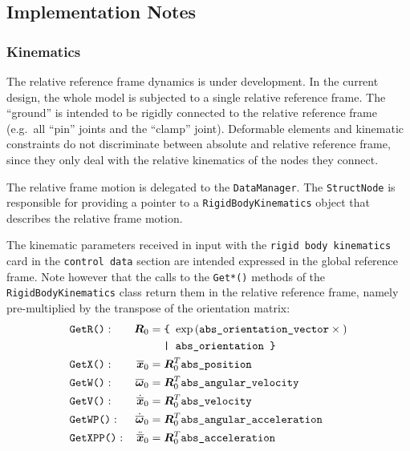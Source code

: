 \documentclass[10pt,fleqn,subeqn]{report}
\newcommand{\T}[1]{\bm{#1}}
\newcommand{\TT}[1]{\bm{#1}}
\begin{document}
\subsection{Implementation Notes}
\label{sec:nodes:structural nodes:implementation notes}

\subsubsection{Kinematics}
The relative reference frame dynamics is under development.
In the current design, the whole model is subjected 
to a single relative reference frame.
The ``ground'' is intended to be rigidly connected
to the relative reference frame (e.g.\ all ``pin'' joints
and the ``clamp'' joint).
Deformable elements and kinematic constraints do not discriminate
between absolute and relative reference frame, since they only deal
with the relative kinematics of the nodes they connect.

The relative frame motion is delegated to the \texttt{DataManager}.
The \texttt{StructNode} is responsible for providing a pointer
to a \texttt{RigidBodyKinematics} object that describes
the relative frame motion.

The kinematic parameters received in input with the
\texttt{rigid body kinematics} card in the \texttt{control data} section
are intended expressed in the global reference frame.
Note however that the calls to the \texttt{Get*()} methods
of the \texttt{RigidBodyKinematics} class return them
in the relative reference frame, namely pre-multiplied
by the transpose of the orientation matrix:
\begin{subequations}
\begin{align}
	& \texttt{GetR()}:
	& \TT{R}_0 &= \texttt{\{ } \mathrm{exp}\plbr{
		\texttt{abs\_orientation\_vector}\times{}
	} \nonumber \\
	& & & \hphantom{=} \texttt{ | abs\_orientation \} } \\
	& \texttt{GetX()}:
	& \overline{\T{x}}_0 &= \TT{R}_0^T \texttt{abs\_position} \\
	& \texttt{GetW()}:
	& \overline{\T{\omega}}_0 &= \TT{R}_0^T \texttt{abs\_angular\_velocity} \\
	& \texttt{GetV()}:
	& \dot{\overline{\T{x}}}_0 &= \TT{R}_0^T \texttt{abs\_velocity} \\
	& \texttt{GetWP()}:
	& \dot{\overline{\T{\omega}}}_0 &= \TT{R}_0^T \texttt{abs\_angular\_acceleration} \\
	& \texttt{GetXPP()}:
	& \ddot{\overline{\T{x}}}_0 &= \TT{R}_0^T \texttt{abs\_acceleration}
\end{align}
\end{subequations}
\end{document}
